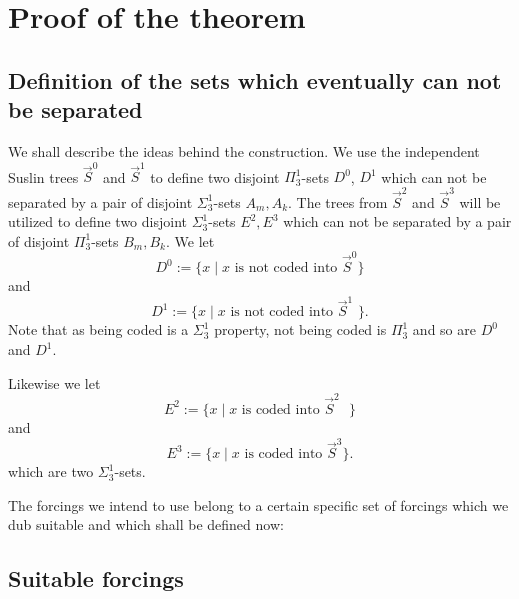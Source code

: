 \documentclass[a4paper,11pt]{article}
\begin{document}
{\section{Proof of the theorem}

\subsection{Definition of the sets which eventually can not be separated}
We shall describe the ideas behind the construction. We use the independent Suslin trees $\vec{S}^0$ and $\vec{S}^1$ to define two disjoint $\Pi^1_3$-sets $D^0$, $D^1$ which can not be separated by a pair of disjoint $\Sigma^1_3$-sets $A_m, A_k$. The trees from $\vec{S}^2$ and $\vec{S}^3$ will be utilized to define two disjoint $\Sigma^1_3$-sets $E^2,E^3$ which can not be separated by a pair of disjoint $\Pi^1_3$-sets $B_m, B_k$. 
We let 
\[D^0:= \{ x \mid x \text{ is not coded into $\vec{S}^0$\}} \]
and
\[ D^1:= \{ x \mid x \text{ is not coded into $\vec{S}^1$ \}.} \]
Note that as being coded is a $\Sigma^1_3$ property, not being coded is $\Pi^1_3$ and so are $D^0$ and $D^1$.

Likewise we let
\[E^2:= \{ x \mid x \text{ is coded into $\vec{S}^2$ } \} \]
and
\[E^3:= \{ x  \mid x \text{ is coded into $\vec{S}^3$}\}. \]
which are two $\Sigma^1_3$-sets.

The forcings we intend to use belong to a certain specific set of forcings which we dub suitable and which shall be defined now:

\subsection{Suitable forcings}

}
\end{document}

